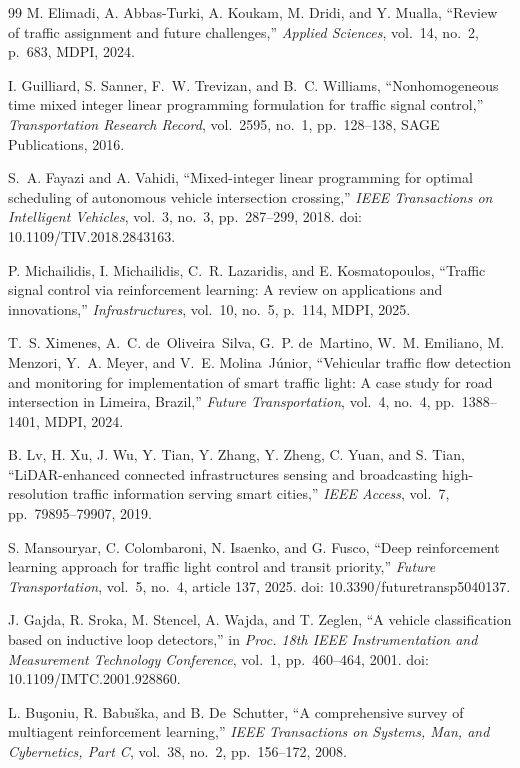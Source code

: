 \documentclass[11pt, a4paper]{report}
\begin{document}
\begin{thebibliography}{99}
M. Elimadi, A. Abbas-Turki, A. Koukam, M. Dridi, and Y. Mualla,
``Review of traffic assignment and future challenges,''
\textit{Applied Sciences}, vol.~14, no.~2, p.~683, MDPI, 2024.

I. Guilliard, S. Sanner, F.~W. Trevizan, and B.~C. Williams,
``Nonhomogeneous time mixed integer linear programming formulation for traffic signal control,''
\textit{Transportation Research Record}, vol.~2595, no.~1, pp.~128--138, SAGE Publications, 2016.

S.~A. Fayazi and A. Vahidi,
``Mixed-integer linear programming for optimal scheduling of autonomous vehicle intersection crossing,''
\textit{IEEE Transactions on Intelligent Vehicles}, vol.~3, no.~3, pp.~287--299, 2018.
doi: 10.1109/TIV.2018.2843163.

P. Michailidis, I. Michailidis, C.~R. Lazaridis, and E. Kosmatopoulos,
``Traffic signal control via reinforcement learning: A review on applications and innovations,''
\textit{Infrastructures}, vol.~10, no.~5, p.~114, MDPI, 2025.

T.~S. Ximenes, A.~C. de~Oliveira~Silva, G.~P. de~Martino, W.~M. Emiliano, M. Menzori, Y.~A. Meyer, and V.~E. Molina~J\'{u}nior,
``Vehicular traffic flow detection and monitoring for implementation of smart traffic light: A case study for road intersection in Limeira, Brazil,''
\textit{Future Transportation}, vol.~4, no.~4, pp.~1388--1401, MDPI, 2024.

B. Lv, H. Xu, J. Wu, Y. Tian, Y. Zhang, Y. Zheng, C. Yuan, and S. Tian,
``LiDAR-enhanced connected infrastructures sensing and broadcasting high-resolution traffic information serving smart cities,''
\textit{IEEE Access}, vol.~7, pp.~79895--79907, 2019.

S. Mansouryar, C. Colombaroni, N. Isaenko, and G. Fusco,
``Deep reinforcement learning approach for traffic light control and transit priority,''
\textit{Future Transportation}, vol.~5, no.~4, article 137, 2025.
doi: 10.3390/futuretransp5040137.

J. Gajda, R. Sroka, M. Stencel, A. Wajda, and T. Zeglen,
``A vehicle classification based on inductive loop detectors,''
in \textit{Proc. 18th IEEE Instrumentation and Measurement Technology Conference}, vol.~1, pp.~460--464, 2001.
doi: 10.1109/IMTC.2001.928860.

L. Bu\c{s}oniu, R. Babu\v{s}ka, and B. De~Schutter,
``A comprehensive survey of multiagent reinforcement learning,''
\textit{IEEE Transactions on Systems, Man, and Cybernetics, Part C}, vol.~38, no.~2, pp.~156--172, 2008.


\end{thebibliography}
\end{document}
